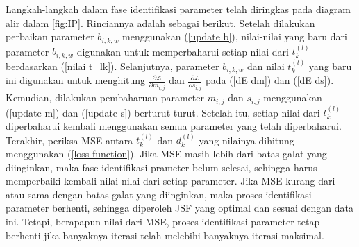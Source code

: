 \noindent Langkah-langkah dalam fase identifikasi parameter telah diringkas pada diagram alir dalam \ref{fig:IP}. Rinciannya adalah sebagai berikut. Setelah dilakukan perbaikan parameter $b_{i,k,w}$ menggunakan (\ref{update b}), nilai-nilai yang baru dari parameter $b_{i,k,w}$ digunakan untuk memperbaharui setiap nilai dari $t^{(l)}_k$ berdasarkan (\ref{nilai t_lk}). Selanjutnya, parameter $b_{i,k,w}$ dan nilai $t^{(l)}_k$ yang baru ini digunakan untuk menghitung $\frac{\partial \mathcal{L}}{\partial m_{i,j}}$ dan $\frac{\partial \mathcal{L}}{\partial s_{i,j}}$ pada (\ref{dE dm}) dan (\ref{dE ds}). Kemudian, dilakukan pembaharuan parameter $m_{i,j}$ dan $s_{i,j}$  menggunakan (\ref{update m}) dan (\ref{update s}) berturut-turut. Setelah itu, setiap nilai dari  $t^{(l)}_k$ diperbaharui kembali menggunakan semua parameter yang telah diperbaharui. Terakhir, periksa MSE antara $t^{(l)}_k$ dan $d^{(l)}_k$ yang nilainya dihitung menggunakan (\ref{loss function}). Jika MSE masih lebih dari batas galat yang diinginkan, maka fase identifikasi prameter belum selesai, sehingga harus memperbaiki kembali nilai-nilai dari setiap parameter. Jika MSE kurang dari atau sama dengan batas galat yang diinginkan, maka proses identifikasi parameter berhenti, sehingga diperoleh JSF yang optimal dan sesuai dengan data ini. Tetapi, berapapun nilai dari MSE, proses identifikasi parameter tetap berhenti jika banyaknya iterasi telah melebihi banyaknya iterasi maksimal.